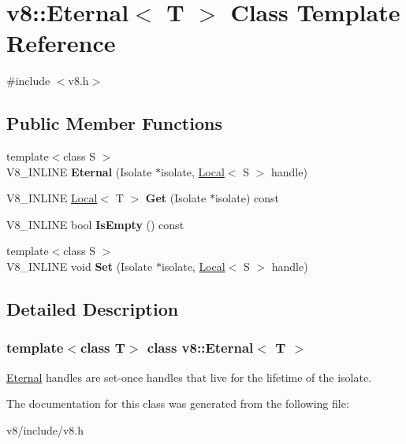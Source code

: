 \hypertarget{classv8_1_1Eternal}{}\section{v8\+:\+:Eternal$<$ T $>$ Class Template Reference}
\label{classv8_1_1Eternal}


{\ttfamily \#include $<$v8.\+h$>$}

\subsection*{Public Member Functions}
\begin{DoxyCompactItemize}
\item 
\mbox{\label{classv8_1_1Eternal_ad7522d8b51e072dcbc4261bc1f155bcb}} 
{\footnotesize template$<$class S $>$ }\\V8\+\_\+\+I\+N\+L\+I\+NE {\bfseries Eternal} (Isolate $\ast$isolate, \mbox{\hyperlink{classv8_1_1Local}{Local}}$<$ S $>$ handle)
\item 
\mbox{\label{classv8_1_1Eternal_a2a615f9cdc8ae38d2380065488c2a397}} 
V8\+\_\+\+I\+N\+L\+I\+NE \mbox{\hyperlink{classv8_1_1Local}{Local}}$<$ T $>$ {\bfseries Get} (Isolate $\ast$isolate) const
\item 
\mbox{\label{classv8_1_1Eternal_a7548826960a4f34ee36947f4fa3765d7}} 
V8\+\_\+\+I\+N\+L\+I\+NE bool {\bfseries Is\+Empty} () const
\item 
\mbox{\label{classv8_1_1Eternal_a75a32f5c428a0d47e13f66dbdeb9adba}} 
{\footnotesize template$<$class S $>$ }\\V8\+\_\+\+I\+N\+L\+I\+NE void {\bfseries Set} (Isolate $\ast$isolate, \mbox{\hyperlink{classv8_1_1Local}{Local}}$<$ S $>$ handle)
\end{DoxyCompactItemize}


\subsection{Detailed Description}
\subsubsection*{template$<$class T$>$\newline
class v8\+::\+Eternal$<$ T $>$}

\mbox{\hyperlink{classv8_1_1Eternal}{Eternal}} handles are set-\/once handles that live for the lifetime of the isolate. 

The documentation for this class was generated from the following file\+:\begin{DoxyCompactItemize}
\item 
v8/include/v8.\+h\end{DoxyCompactItemize}
